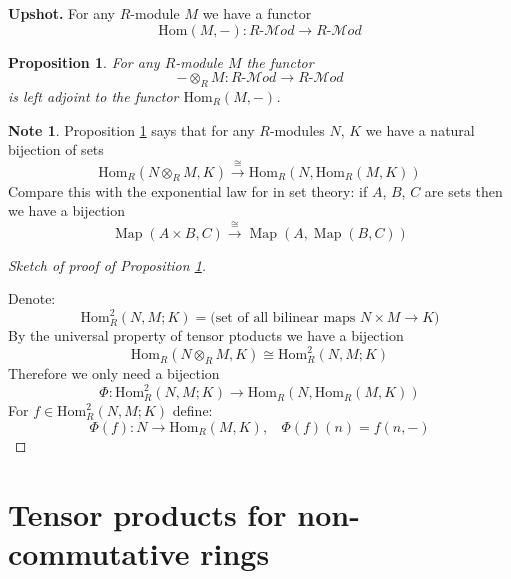\documentclass[12pt, letterpaper, oneside]{article}
\theoremstyle{plain}
\newtheorem{proposition}[theorem]{Proposition}
\theoremstyle{definition}
\newtheorem{note}[theorem]{Note}
\newcommand{\lra}{\longrightarrow}
\newcommand{\Hom}{\mathrm{Hom}}
\newcommand{\Mod}{{\mathcal Mod}}
\newcommand{\vs}{\vskip 5mm}
\begin{document}
\vs\vs

\textbf{Upshot.} For any $R$-module $M$ we have a functor 
$$\Hom(M, -)\colon R\text{-}\Mod \lra R\text{-}\Mod$$
  


\vs\vs


\begin{proposition}
\label{PROP_TENSORADJ}
For any $R$-module $M$ the functor 
$$-\otimes_{R} M \colon R\text{-}\Mod \lra R\text{-}\Mod$$ 
is left adjoint to the functor $\Hom_{R}(M, -)$.
\end{proposition}


\vs\vs

\begin{note}
Proposition \ref{PROP_TENSORADJ} says that for any $R$-modules $N$, $K$ we have 
a natural bijection of sets
$$\Hom_{R}(N\otimes_{R}M, K) \overset{\cong}{\lra} \Hom_{R}(N, \Hom_{R}(M, K))$$
Compare this with the exponential law for in set theory: if $A$, $B$, $C$ are sets then
we have a bijection 
$$\operatorname{Map}(A\times B, C) \overset{\cong}{\lra} 
\operatorname{Map}(A, \operatorname{Map}(B, C))$$
\end{note}


\vs\vs

\begin{proof}[Sketch of proof of Proposition \ref{PROP_TENSORADJ}] \ 

Denote:
$$\Hom^{2}_{R}(N, M; K) = \text{(set of all bilinear maps $N\times M \to K$)}$$
By the universal property of tensor ptoducts we have a bijection
$$\Hom_{R}(N\otimes_{R}M, K) \cong \Hom^{2}_{R}(N, M; K)$$
Therefore we only need a bijection 
$$ \Phi\colon \Hom^{2}_{R}(N, M; K) \lra \Hom_{R}(N, \Hom_{R}(M, K))$$
For $f\in \Hom^{2}_{R}(N, M; K)$ define: 
$$\Phi(f)\colon N \to \Hom_{R}(M, K), \ \ \ \ \Phi(f)(n) = f(n, -)$$




\end{proof}











\newpage
\section{Tensor products for non-commutative rings}
\label{SEC_TENSORPRODNONCOMM}
\end{document}
